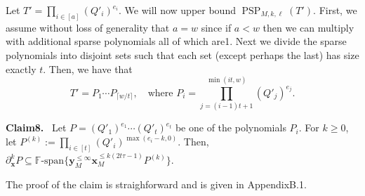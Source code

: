 \documentclass[10pt,a4paper]{article}
\newenvironment{authorclaim}[1]{\par\medskip\noindent\textbf{#1.}\ \ignorespaces}{\par\medskip}
\DeclareMathOperator{\PSP}{PSP}
\begin{document}
Let $T'=\prod_{i\in[a]}(Q'_i)^{e_i}$. We will now upper bound $\PSP_{M,k,\ell}(T')$. First, we assume without loss of generality that $a=w$ since if $a<w$ then we can multiply with additional sparse polynomials all of which are1. Next we divide the sparse polynomials into disjoint sets such that each set (except perhaps the last) has size exactly $t$. Then, we have that
\[
T'=P_1\cdots P_{\lceil w/t\rceil},\quad\text{where }P_i=\prod_{j=(i-1)t+1}^{\min(it,w)}(Q'_j)^{e_j}.
\]
\begin{authorclaim}{Claim8}
Let $P=(Q'_1)^{e_1}\cdots(Q'_t)^{e_t}$ be one of the polynomials $P_i$. For $k\ge0$, let $P^{(k)}:=\prod_{i\in[t]}(Q'_i)^{\max(e_i-k,0)}$. Then,
$\partial_{\mathbf x}^kP\subseteq\mathbb F\text{-span}\{\mathbf y_M^{\le\infty}\mathbf x_M^{\le k(2t\tau-1)}P^{(k)}\}$.
\end{authorclaim}
The proof of the claim is straighforward and is given in AppendixB.1.
\end{document}
